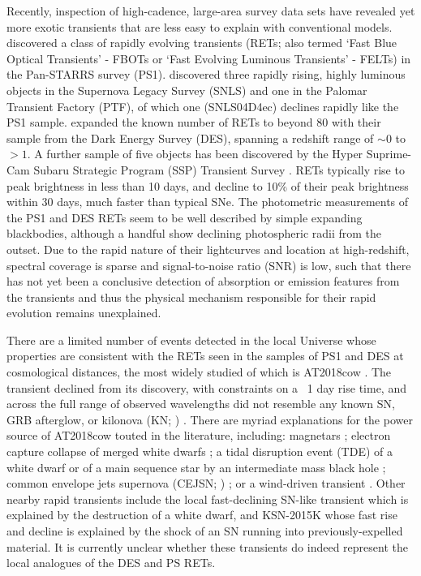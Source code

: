 \documentclass[fleqn,usenatbib,]{mnras}
\newcommand{\replychris}[1]{\color{magenta}#1 \color{black}}
\newcommand{\replylluis}[1]{\color{green}#1 \color{black}}
\begin{document}
Recently, inspection of high-cadence, large-area survey data sets have revealed yet more exotic transients that are less easy to explain with conventional models. \citet{Drout2014} discovered a class of rapidly evolving transients (RETs; also termed `Fast Blue Optical Transients' - FBOTs or `Fast Evolving Luminous Transients' - FELTs) in the Pan-STARRS survey (PS1). \replychris{\citet{Arcavi2016} discovered three rapidly rising, highly luminous objects in the Supernova Legacy Survey (SNLS) and one in the Palomar Transient Factory (PTF), of which one (SNLS04D4ec) declines rapidly like the PS1 sample.} \citet{Pursiainen2018} expanded the known number of RETs to beyond 80 with their sample from the Dark Energy Survey (DES), spanning a redshift range of $\sim 0$ to $>1$. A further sample of five objects has been discovered by the Hyper Suprime-Cam Subaru Strategic Program (SSP) Transient Survey \citep{Tampo2020}. RETs typically rise to peak brightness in less than 10 days, and decline to 10\% of their peak brightness within 30 days, much faster than typical SNe. The photometric measurements of the PS1 and DES RETs seem to be well described by simple expanding blackbodies, although a handful show declining photospheric radii from the outset. Due to the rapid nature of their lightcurves and location at high-redshift, spectral coverage is sparse and signal-to-noise ratio (SNR) is low, such that there has not yet been a conclusive detection of absorption or emission features from the transients and thus the physical mechanism responsible for their rapid evolution remains unexplained.

There are a limited number of events detected in the local Universe whose properties are consistent with the RETs seen in the samples of PS1 and DES at cosmological distances, the most widely studied of which is AT2018cow \citep[e.g.][]{Prentice2018,Perley2019}. The transient declined from its discovery, with constraints on a ~1 day rise time, and across the full range of observed wavelengths did not resemble any known SN, GRB afterglow, or kilonova \replylluis{(KN; \citealt{Ho2019})}. There are myriad explanations for the power source of AT2018cow touted in the literature, including: magnetars \citep{Mohan2020}; electron capture collapse of merged white dwarfs \citep{Lyutikov2019}; a tidal disruption event (TDE) of a white dwarf \citep{Kuin2019} or of a main sequence star by an intermediate mass black hole \citep{Perley2019}; common envelope jets supernova \replylluis{(CEJSN; \citealt{Soker2019})}; \replychris{or a wind-driven transient \citep{Ono2020}}.
Other nearby rapid transients include the local fast-declining SN-like transient \citep{McBrien2019} which is explained by the destruction of a white dwarf, and KSN-2015K \citep{Rest2018} whose fast rise and decline is explained by the shock of an SN running into previously-expelled material.  It is currently unclear whether these transients do indeed represent the local analogues of the DES and PS RETs.
\end{document}
